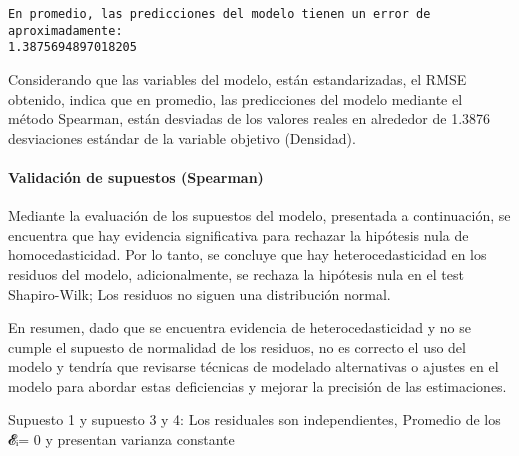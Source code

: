 \documentclass[11pt]{article}
\begin{document}
    \begin{Verbatim}[commandchars=\\\{\}]
En promedio, las predicciones del modelo tienen un error de aproximadamente:
1.3875694897018205
    \end{Verbatim}

    Considerando que las variables del modelo, están estandarizadas, el RMSE
obtenido, indica que en promedio, las predicciones del modelo mediante
el método Spearman, están desviadas de los valores reales en alrededor
de 1.3876 desviaciones estándar de la variable objetivo (Densidad).

    \hypertarget{validaciuxf3n-de-supuestos-spearman}{%
\paragraph{Validación de supuestos
(Spearman)}\label{validaciuxf3n-de-supuestos-spearman}}

Mediante la evaluación de los supuestos del modelo, presentada a
continuación, se encuentra que hay evidencia significativa para rechazar
la hipótesis nula de homocedasticidad. Por lo tanto, se concluye que hay
heterocedasticidad en los residuos del modelo, adicionalmente, se
rechaza la hipótesis nula en el test Shapiro-Wilk; Los residuos no
siguen una distribución normal.

En resumen, dado que se encuentra evidencia de heterocedasticidad y no
se cumple el supuesto de normalidad de los residuos, no es correcto el
uso del modelo y tendría que revisarse técnicas de modelado alternativas
o ajustes en el modelo para abordar estas deficiencias y mejorar la
precisión de las estimaciones.

Supuesto 1 y supuesto 3 y 4: Los residuales son independientes, Promedio
de los 𝓔ᵢ= 0 y presentan varianza constante
\end{document}

